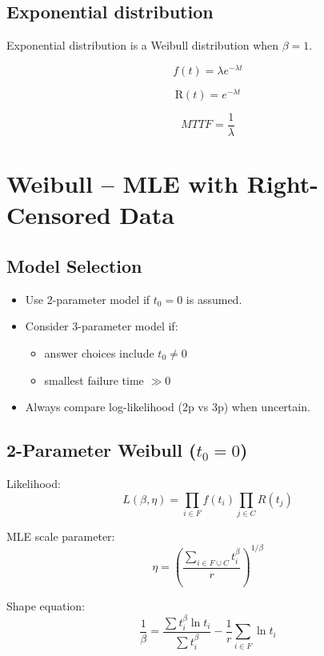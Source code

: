 \documentclass[10pt,a4paper,twocolumn]{article}
\newcommand{\R}{\mathrm{R}}
\begin{document}
\subsection*{Exponential distribution}

Exponential distribution is a Weibull distribution when $\beta = 1$.

\[f(t)=\lambda e^{-\lambda t}\]

\[\R(t)=e^{-\lambda t}\]

\[MTTF=\frac{1}{\lambda}\]
\section*{Weibull – MLE with Right-Censored Data}

\subsection*{Model Selection}

\begin{itemize}
\item Use 2-parameter model if $t_0 = 0$ is assumed.
\item Consider 3-parameter model if:
      \begin{itemize}
      \item answer choices include $t_0 \neq 0$
      \item smallest failure time $\gg 0$
      \end{itemize}
\item Always compare log-likelihood (2p vs 3p) when uncertain.
\end{itemize}

\subsection*{2-Parameter Weibull ($t_0 = 0$)}

Likelihood:
\[
L(\beta,\eta)
=
\prod_{i\in F} f(t_i)
\prod_{j\in C} R(t_j)
\]

MLE scale parameter:
\[
\eta=
\left(
\frac{
\sum_{i\in F\cup C} t_i^\beta
}{r}
\right)^{1/\beta}
\]

Shape equation:
\[
\frac{1}{\beta}
=
\frac{
\sum t_i^\beta \ln t_i
}{
\sum t_i^\beta
}
-
\frac{1}{r}
\sum_{i\in F}
\ln t_i
\]

\end{document}
